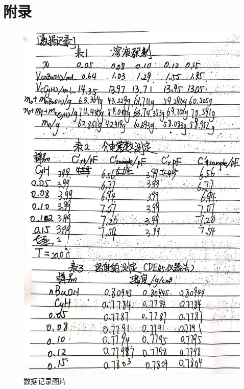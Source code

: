 \documentclass[cn,hazy,pku,12pt,normal,math=newtx,cite=super]{elegantnote}
\begin{document}
\section{附录}
\begin{figure}[htbp]
    \centering
    \includegraphics[width = .70\textwidth]{image/sysj.jpg}
    \caption{数据记录图片}\label{s0}
\end{figure}

\nocite{*}

\newpage

\end{document}
